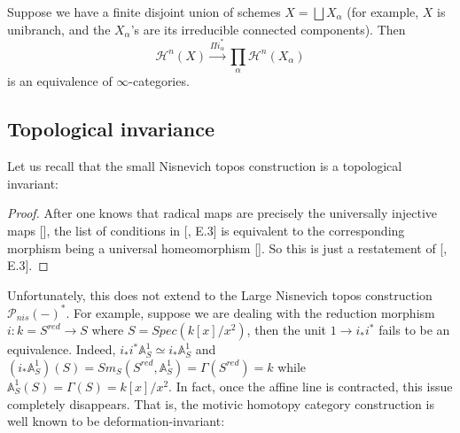       \begin{cor}\label{zar add}
           Suppose we have a finite disjoint union of schemes $X=\bigsqcup X_\alpha$ (for example, $X$ is unibranch, and the $X_\alpha$'s are its irreducible connected components). Then $$\mathcal{H} ^{n}(X)\xrightarrow[]{\Pi i_\alpha^*}\underset{\alpha} {\prod}  \mathcal{H}^{n}(X_\alpha){}$$ is an equivalence of $\infty$-categories. 
       \end{cor}
\subsection{Topological invariance}
Let us recall that the small Nisnevich topos construction is a topological invariant:
\begin{proof}
    After one knows that radical maps are precisely the universally injective maps [\cite[\href{https://stacks.math.columbia.edu/tag/01S4}{Lemma 01S4}]{stacks-project}], the list of conditions in [\cite{MR1106918}, E.3] is equivalent to the corresponding morphism being a universal homeomorphism [\cite[\href{https://stacks.math.columbia.edu/tag/04DF}{Lemma 04DF}]{stacks-project}]. So this is just a restatement of [\cite{MR1106918}, E.3]. 
\end{proof}
Unfortunately, this does not extend to the Large Nisnevich topos construction $\mathcal{P}_{nis}(-)^*$. For example, suppose we are dealing with the reduction morphism $i:k=S^{red}\to S$ where $S=Spec (k[x]/x^2)$, then the unit $1\to i_*i^*$ fails to be an equivalence. Indeed, $i_*i^*\mathbb{A}^1_S\simeq i_*\mathbb{A}^1_S$ and $(i_*\mathbb{A}^1_S)(S)=Sm_S(S^{red},\mathbb{A}^1_S)=\Gamma(S^{red})=k$ while $\mathbb{A}^1_S(S)=\Gamma(S)=k[x]/x^2$. In fact, once the affine line is contracted, this issue completely disappears. That is, the motivic homotopy category construction is well known to be deformation-invariant:

